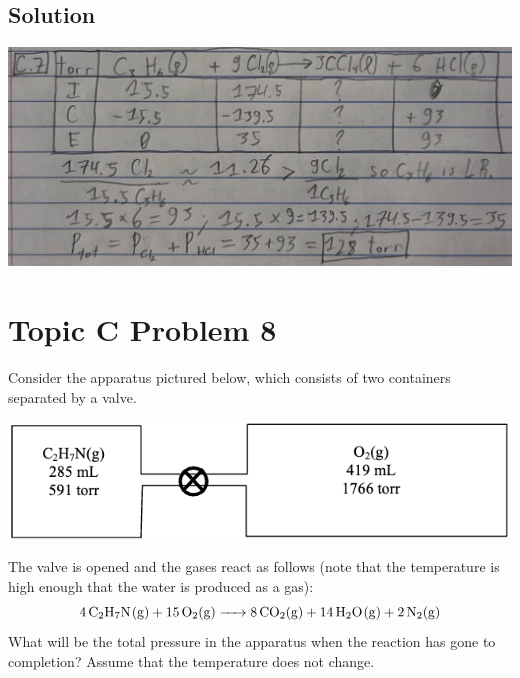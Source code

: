 \documentclass[10pt]{article}
\begin{document}
        \subsection{Solution}
            \begin{center}
                \includegraphics[width=\textwidth]{Answers Images/answer_C_7.jpg}
            \end{center}

    \pagebreak
    \section{Topic C Problem 8}
        Consider the apparatus pictured below, which consists of two containers separated by a valve.
        \begin{center}
            \includegraphics{picture_C-8.png}
        \end{center}
        The valve is opened and the gases react as follows (note that the temperature is high enough that
        the water is produced as a gas):
        \begin{equation}
            \ce{4 C2H7N(g) + 15 O2(g) -> 8 CO2(g) + 14 H2O(g) + 2 N2(g)}
        \end{equation}
        What will be the total pressure in the apparatus when the reaction has gone to completion?
        Assume that the temperature does not change.
\end{document}
